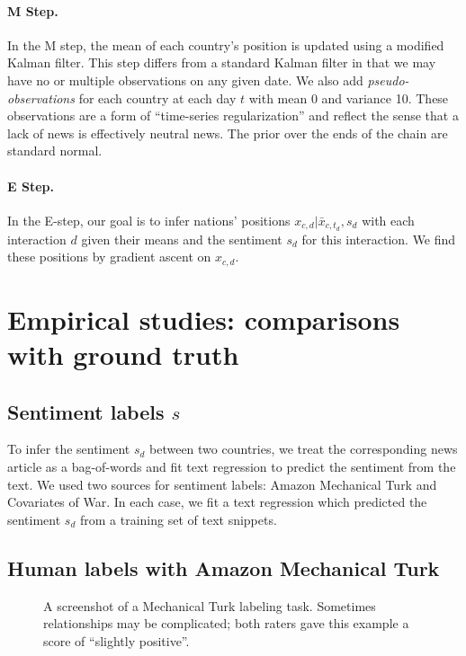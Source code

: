 \paragraph{M Step.} In the M step, the mean of each country's position
is updated using a modified Kalman filter.  This step differs from a
standard Kalman filter in that we may have no or multiple observations
on any given date.  We also add \emph{pseudo-observations} for each
country at each day $t$ with mean 0 and variance 10.  These
observations are a form of ``time-series regularization'' and reflect
the sense that a lack of news is effectively neutral news. The prior
over the ends of the chain are standard normal.

\paragraph{E Step.} In the E-step, our goal is to infer nations'
positions $x_{c,d} | \bar{x}_{c,t_d}, s_d$ with each interaction $d$ given
their means and the sentiment $s_d$ for this interaction.  We find
these positions by gradient ascent on $x_{c,d}$.

\section{Empirical studies: comparisons with ground truth}

\subsection{Sentiment labels $s$}

To infer the sentiment $s_d$ between two countries, we treat the
corresponding news article as a bag-of-words and fit text regression
\cite{kogan:2009} to predict the sentiment from the text.  We used two
sources for sentiment labels: Amazon Mechanical Turk and Covariates of
War.  In each case, we fit a text regression which predicted the
sentiment $s_d$ from a training set of text snippets.

\label{section:sentiment_models}
\subsection{Human labels with Amazon Mechanical Turk}
\label{section:mturk}
\begin{figure}
  \setlength\fboxsep{0pt}
  \setlength\fboxrule{0.5pt}
  \center {}
  \label{figure:mechanical_turk_sample}
  \small\caption{A screenshot of a Mechanical Turk labeling task.
    Sometimes relationships may be complicated; both raters gave this
    example a score of ``slightly positive''.}
  \normalsize
\end{figure}

